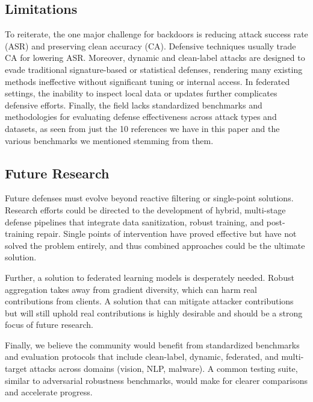\documentclass[sigconf,authorversion,nonacm,balance=false]{acmart}
\begin{document}
\subsection{Limitations}
To reiterate, the one major challenge for backdoors is reducing attack success rate (ASR) and preserving clean accuracy (CA). Defensive techniques usually trade CA for lowering ASR. Moreover, dynamic and clean-label attacks are designed to evade traditional signature-based or statistical defenses, rendering many existing methods ineffective without significant tuning or internal access. In federated settings, the inability to inspect local data or updates further complicates defensive efforts. Finally, the field lacks standardized benchmarks and methodologies for evaluating defense effectiveness across attack types and datasets, as seen from just the 10 references we have in this paper and the various benchmarks we mentioned stemming from them.

\subsection{Future Research}
Future defenses must evolve beyond reactive filtering or single-point solutions. Research efforts could be directed to the development of hybrid, multi-stage defense pipelines that integrate data sanitization, robust training, and post-training repair. Single points of intervention have proved effective but have not solved the problem entirely, and thus combined approaches could be the ultimate solution.

Further, a solution to federated learning models is desperately needed. Robust aggregation takes away from gradient diversity, which can harm real contributions from clients. A solution that can mitigate attacker contributions but will still uphold real contributions is highly desirable and should be a strong focus of future research.

Finally, we believe the community would benefit from standardized benchmarks and evaluation protocols that include clean-label, dynamic, federated, and multi-target attacks across domains (vision, NLP, malware). A common testing suite, similar to adversarial robustness benchmarks, would make for clearer comparisons and accelerate progress.

\newpage


\end{document}

